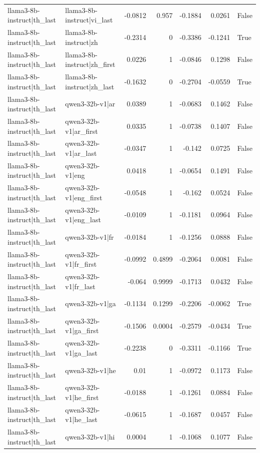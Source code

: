 \begin{table}
\begin{tabular}{l l r r r r l}
llama3-8b-instruct|th_last & llama3-8b-instruct|vi_last & -0.0812 & 0.957 & -0.1884 & 0.0261 & False \\
llama3-8b-instruct|th_last & llama3-8b-instruct|zh & -0.2314 & 0 & -0.3386 & -0.1241 & True \\
llama3-8b-instruct|th_last & llama3-8b-instruct|zh_first & 0.0226 & 1 & -0.0846 & 0.1298 & False \\
llama3-8b-instruct|th_last & llama3-8b-instruct|zh_last & -0.1632 & 0 & -0.2704 & -0.0559 & True \\
llama3-8b-instruct|th_last & qwen3-32b-v1|ar & 0.0389 & 1 & -0.0683 & 0.1462 & False \\
llama3-8b-instruct|th_last & qwen3-32b-v1|ar_first & 0.0335 & 1 & -0.0738 & 0.1407 & False \\
llama3-8b-instruct|th_last & qwen3-32b-v1|ar_last & -0.0347 & 1 & -0.142 & 0.0725 & False \\
llama3-8b-instruct|th_last & qwen3-32b-v1|eng & 0.0418 & 1 & -0.0654 & 0.1491 & False \\
llama3-8b-instruct|th_last & qwen3-32b-v1|eng_first & -0.0548 & 1 & -0.162 & 0.0524 & False \\
llama3-8b-instruct|th_last & qwen3-32b-v1|eng_last & -0.0109 & 1 & -0.1181 & 0.0964 & False \\
llama3-8b-instruct|th_last & qwen3-32b-v1|fr & -0.0184 & 1 & -0.1256 & 0.0888 & False \\
llama3-8b-instruct|th_last & qwen3-32b-v1|fr_first & -0.0992 & 0.4899 & -0.2064 & 0.0081 & False \\
llama3-8b-instruct|th_last & qwen3-32b-v1|fr_last & -0.064 & 0.9999 & -0.1713 & 0.0432 & False \\
llama3-8b-instruct|th_last & qwen3-32b-v1|ga & -0.1134 & 0.1299 & -0.2206 & -0.0062 & True \\
llama3-8b-instruct|th_last & qwen3-32b-v1|ga_first & -0.1506 & 0.0004 & -0.2579 & -0.0434 & True \\
llama3-8b-instruct|th_last & qwen3-32b-v1|ga_last & -0.2238 & 0 & -0.3311 & -0.1166 & True \\
llama3-8b-instruct|th_last & qwen3-32b-v1|he & 0.01 & 1 & -0.0972 & 0.1173 & False \\
llama3-8b-instruct|th_last & qwen3-32b-v1|he_first & -0.0188 & 1 & -0.1261 & 0.0884 & False \\
llama3-8b-instruct|th_last & qwen3-32b-v1|he_last & -0.0615 & 1 & -0.1687 & 0.0457 & False \\
llama3-8b-instruct|th_last & qwen3-32b-v1|hi & 0.0004 & 1 & -0.1068 & 0.1077 & False \\

\end{tabular}
\end{table}
